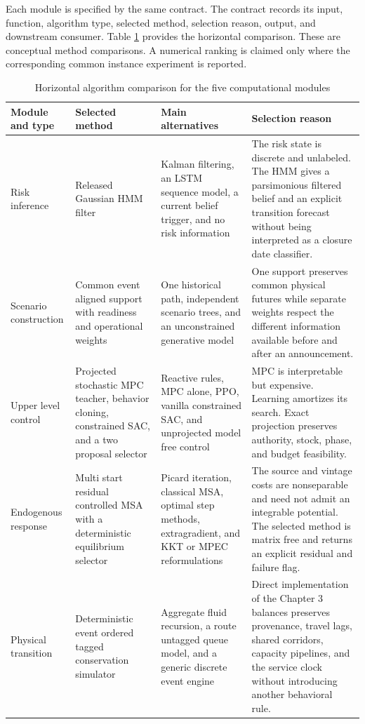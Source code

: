 \documentclass[a4paper,fleqn]{cas-sc}
\begin{document}
Each module is specified by the same contract. The contract records its input,
function, algorithm type, selected method, selection reason, output, and
downstream consumer. Table \ref{tab:algorithm-comparison} provides the
horizontal comparison. These are conceptual method comparisons. A numerical
ranking is claimed only where the corresponding common instance experiment is
reported.

\begin{table}[t]
\centering
\caption{Horizontal algorithm comparison for the five computational modules}
\label{tab:algorithm-comparison}
\small
\begin{tabularx}{\textwidth}{@{}
 >{\RaggedRight\arraybackslash}p{}
 >{\RaggedRight\arraybackslash}p{}
 >{\RaggedRight\arraybackslash}p{}
 >{\RaggedRight\arraybackslash}X@{}}
\toprule
Module and type & Selected method & Main alternatives & Selection reason \\
\midrule
Risk inference
& Released Gaussian HMM filter
& Kalman filtering, an LSTM sequence model, a current belief trigger, and no risk information
& The risk state is discrete and unlabeled. The HMM gives a parsimonious filtered belief and an explicit transition forecast without being interpreted as a closure date classifier. \\
Scenario construction
& Common event aligned support with readiness and operational weights
& One historical path, independent scenario trees, and an unconstrained generative model
& One support preserves common physical futures while separate weights respect the different information available before and after an announcement. \\
Upper level control
& Projected stochastic MPC teacher, behavior cloning, constrained SAC, and a two proposal selector
& Reactive rules, MPC alone, PPO, vanilla constrained SAC, and unprojected model free control
& MPC is interpretable but expensive. Learning amortizes its search. Exact projection preserves authority, stock, phase, and budget feasibility. \\
Endogenous response
& Multi start residual controlled MSA with a deterministic equilibrium selector
& Picard iteration, classical MSA, optimal step methods, extragradient, and KKT or MPEC reformulations
& The source and vintage costs are nonseparable and need not admit an integrable potential. The selected method is matrix free and returns an explicit residual and failure flag. \\
Physical transition
& Deterministic event ordered tagged conservation simulator
& Aggregate fluid recursion, a route untagged queue model, and a generic discrete event engine
& Direct implementation of the Chapter 3 balances preserves provenance, travel lags, shared corridors, capacity pipelines, and the service clock without introducing another behavioral rule. \\
\bottomrule
\end{tabularx}
\end{table}
\end{document}
